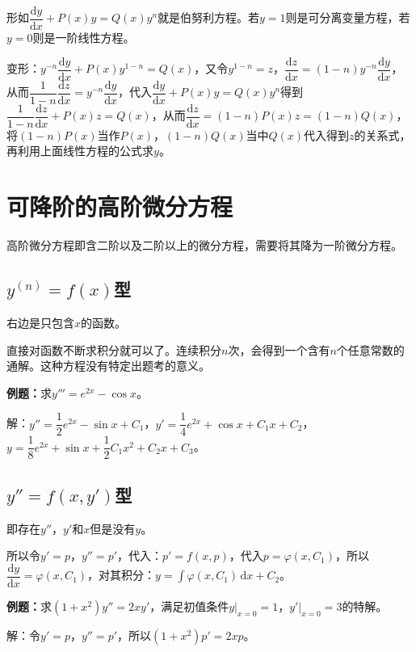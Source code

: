 \documentclass[UTF8, 12pt]{ctexart}
\begin{document}
        形如$\dfrac{\textrm{d}y}{\textrm{d}x}+P(x)y=Q(x)y^n$就是伯努利方程。若$y=1$则是可分离变量方程，若$y=0$则是一阶线性方程。

        变形：$y^{-n}\dfrac{\textrm{d}y}{\textrm{d}x}+P(x)y^{1-n}=Q(x)$，又令$y^{1-n}=z$，$\dfrac{\textrm{d}z}{\textrm{d}x}=(1-n)y^{-n}\dfrac{\textrm{d}y}{\textrm{d}x}$，从而$\dfrac{1}{1-n}\dfrac{\textrm{d}z}{\textrm{d}x}=y^{-n}\dfrac{\textrm{d}y}{\textrm{d}x}$，代入$\dfrac{\textrm{d}y}{\textrm{d}x}+P(x)y=Q(x)y^n$得到$\dfrac{1}{1-n}\dfrac{\textrm{d}z}{\textrm{d}x}+P(x)z=Q(x)$，从而$\dfrac{\textrm{d}z}{\textrm{d}x}=(1-n)P(x)z=(1-n)Q(x)$，将$(1-n)P(x)$当作$P(x)$，$(1-n)Q(x)$当中$Q(x)$代入得到$z$的关系式，再利用上面线性方程的公式求$y$。

        \section{可降阶的高阶微分方程}

        高阶微分方程即含二阶以及二阶以上的微分方程，需要将其降为一阶微分方程。

        \subsection{\texorpdfstring{$y^{(n)}=f(x)$}\ 型}

        右边是只包含$x$的函数。

        直接对函数不断求积分就可以了。连续积分$n$次，会得到一个含有$n$个任意常数的通解。这种方程没有特定出题考的意义。

        \textbf{例题：}求$y'''=e^{2x}-\cos x$。

        解：$y''=\dfrac{1}{2}e^{2x}-\sin x+C_1$，$y'=\dfrac{1}{4}e^{2x}+\cos x+C_1x+C_2$，$y=\dfrac{1}{8}e^{2x}+\sin x+\dfrac{1}{2}C_1x^2+C_2x+C_3$。

        \subsection{\texorpdfstring{$y''=f(x,y')$}\ 型}

        即存在$y''$，$y'$和$x$但是没有$y$。

        所以令$y'=p$，$y''=p'$，代入：$p'=f(x,p)$，代入$p=\varphi(x,C_1)$，所以$\dfrac{\textrm{d}y}{\textrm{d}x}=\varphi(x,C_1)$，对其积分：$y=\int\varphi(x,C_1)\,\textrm{d}x+C_2$。

        \textbf{例题：}求$(1+x^2)y''=2xy'$，满足初值条件$y\vert_{x=0}=1$，$y'\vert_{x=0}=3$的特解。

        解：令$y'=p$，$y''=p'$，所以$(1+x^2)p'=2xp$。
\end{document}

